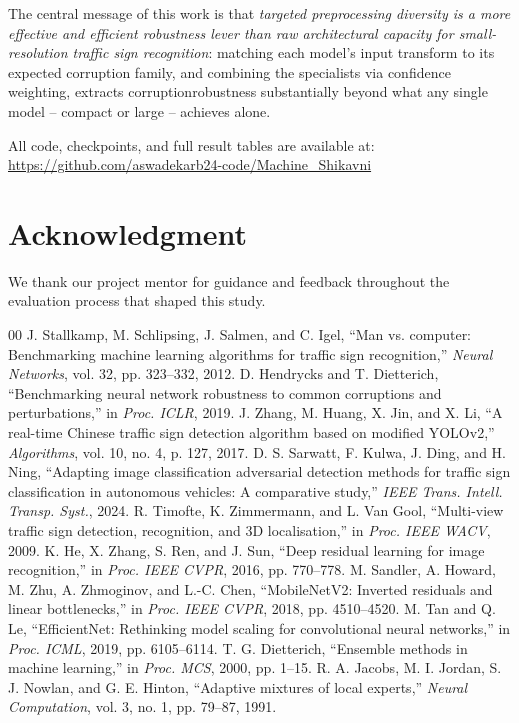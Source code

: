 \documentclass[conference]{IEEEtran}
\begin{document}
The central message of this work is that \emph{targeted preprocessing diversity is a more effective and efficient robustness lever than raw architectural capacity for small-resolution traffic sign recognition}: matching each model's input transform to its expected corruption family, and combining the specialists via confidence weighting, extracts corruptionrobustness substantially beyond what any single model -- compact or large -- achieves alone.

All code, checkpoints, and full result tables are available at: \url{https://github.com/aswadekarb24-code/Machine_Shikavni}

\section*{Acknowledgment}
We thank our project mentor for guidance and feedback throughout the evaluation process that shaped this study.

\begin{thebibliography}{00}
 J. Stallkamp, M. Schlipsing, J. Salmen, and C. Igel, ``Man vs. computer: Benchmarking machine learning algorithms for traffic sign recognition,'' \textit{Neural Networks}, vol. 32, pp. 323--332, 2012.
 D. Hendrycks and T. Dietterich, ``Benchmarking neural network robustness to common corruptions and perturbations,'' in \textit{Proc. ICLR}, 2019.
 J. Zhang, M. Huang, X. Jin, and X. Li, ``A real-time Chinese traffic sign detection algorithm based on modified YOLOv2,'' \textit{Algorithms}, vol. 10, no. 4, p. 127, 2017.
 D. S. Sarwatt, F. Kulwa, J. Ding, and H. Ning, ``Adapting image classification adversarial detection methods for traffic sign classification in autonomous vehicles: A comparative study,'' \textit{IEEE Trans. Intell. Transp. Syst.}, 2024.
 R. Timofte, K. Zimmermann, and L. Van Gool, ``Multi-view traffic sign detection, recognition, and 3D localisation,'' in \textit{Proc. IEEE WACV}, 2009.
 K. He, X. Zhang, S. Ren, and J. Sun, ``Deep residual learning for image recognition,'' in \textit{Proc. IEEE CVPR}, 2016, pp. 770--778.
 M. Sandler, A. Howard, M. Zhu, A. Zhmoginov, and L.-C. Chen, ``MobileNetV2: Inverted residuals and linear bottlenecks,'' in \textit{Proc. IEEE CVPR}, 2018, pp. 4510--4520.
 M. Tan and Q. Le, ``EfficientNet: Rethinking model scaling for convolutional neural networks,'' in \textit{Proc. ICML}, 2019, pp. 6105--6114.
 T. G. Dietterich, ``Ensemble methods in machine learning,'' in \textit{Proc. MCS}, 2000, pp. 1--15.
 R. A. Jacobs, M. I. Jordan, S. J. Nowlan, and G. E. Hinton, ``Adaptive mixtures of local experts,'' \textit{Neural Computation}, vol. 3, no. 1, pp. 79--87, 1991.
\end{thebibliography}
\end{document}
